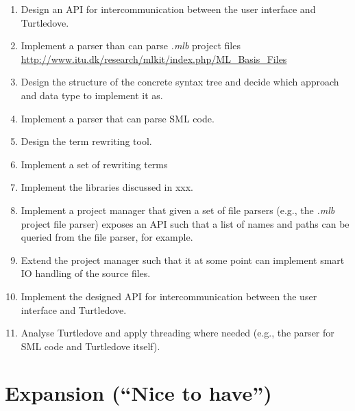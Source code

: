 \documentclass[a4paper,oneside]{article}
\begin{document}
\begin{enumerate}

\item Design an API for intercommunication between the user interface and
  Turtledove.

\item Implement a parser than can parse \textit{.mlb} project files
  \url{http://www.itu.dk/research/mlkit/index.php/ML_Basis_Files}

\item Design the structure of the concrete syntax tree and decide which approach
  and data type to implement it as.

\item Implement a parser that can parse SML code.

\item Design the term rewriting tool.

\item Implement a set of rewriting terms

\item Implement the libraries discussed in xxx. 

\item Implement a project manager that given a set of file parsers (e.g., the \textit{.mlb} project file
  parser) exposes an API such that a list of names and paths can be queried from
  the file parser, for example.

\item Extend the project manager such that it at some point can implement smart
  IO handling of the source files.

\item Implement the designed API for intercommunication between the user
  interface and Turtledove.

\item Analyse Turtledove and apply threading where needed (e.g., the parser for
  SML code and Turtledove itself).

\end{enumerate}




\section{Expansion (``Nice to have'')}

\end{document}
